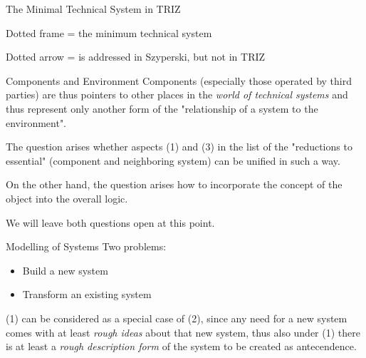 \documentclass{beamer}
\begin{document}
\begin{frame}{The Minimal Technical System in TRIZ}

\begin{center}
\end{center}
Dotted frame = the minimum technical system

Dotted arrow = is addressed in Szyperski, but not in TRIZ 
\end{frame}

\begin{frame}{Components and Environment}  
  Components (especially those operated by third parties) are thus pointers to
  other places in the \emph{world of technical systems} and thus represent
  only another form of the "relationship of a system to the environment".
  
  The question arises whether aspects (1) and (3) in the list of the
  "reductions to essential" (component and neighboring system) can be unified
  in such a way.  

  On the other hand, the question arises how to incorporate the concept of the
  object into the overall logic. 

  We will leave both questions open at this point. 
\end{frame}

\begin{frame}{Modelling of Systems}
  Two problems:
  \begin{itemize}
  \item[(1)] Build a new system
  \item[(2)] Transform an existing system
  \end{itemize}
  (1) can be considered as a special case of (2), since any need for a new
  system comes with at least \emph{rough ideas} about that new system, thus
  also under (1) there is at least a \emph{rough description form}
  of the system to be created as antecendence.
\end{frame}
\end{document}
